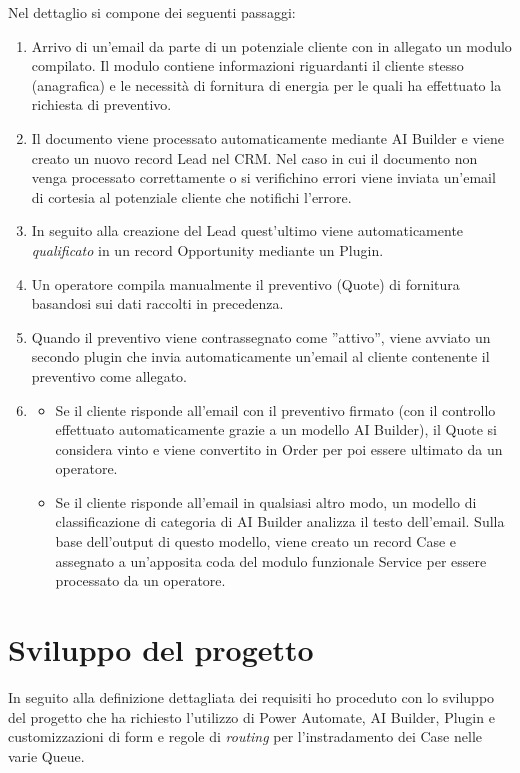 Nel dettaglio si compone dei seguenti passaggi:
\begin{enumerate}
  \item Arrivo di un'email da parte di un potenziale cliente con in allegato un modulo compilato. Il modulo contiene informazioni riguardanti il cliente stesso (anagrafica) e le necessità di fornitura di energia per le quali ha effettuato la richiesta di preventivo.
  \item Il documento viene processato automaticamente mediante AI Builder e viene creato un nuovo record Lead nel CRM. Nel caso in cui il documento non venga processato correttamente o si verifichino errori viene inviata un'email di cortesia al potenziale cliente che notifichi l'errore.
  \item In seguito alla creazione del Lead quest'ultimo viene automaticamente \textit{qualificato} in un record Opportunity mediante un Plugin.
  \item Un operatore compila manualmente il preventivo (Quote) di fornitura basandosi sui dati raccolti in precedenza. 
  \item  Quando il preventivo viene contrassegnato come ''attivo'', viene avviato un secondo plugin che invia automaticamente un'email al cliente contenente il preventivo come allegato.
  \item 
  \begin{itemize}
    \item Se il cliente risponde all'email con il preventivo firmato (con il controllo effettuato automaticamente grazie a un modello AI Builder), il Quote si considera vinto e viene convertito in Order per poi essere ultimato da un operatore. 
    \item Se il cliente risponde all'email in qualsiasi altro modo, un modello di classificazione di categoria di AI Builder analizza il testo dell'email. Sulla base dell'output di questo modello, viene creato un record Case e assegnato a un'apposita coda del modulo funzionale Service per essere processato da un operatore.
  \end{itemize}
\end{enumerate}

\section{Sviluppo del progetto}
In seguito alla definizione dettagliata dei requisiti ho proceduto con lo sviluppo del progetto che ha richiesto l'utilizzo di Power Automate, AI Builder, Plugin e customizzazioni di form e regole di \textit{routing} per l'instradamento dei Case nelle varie Queue.

